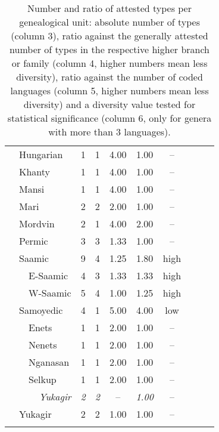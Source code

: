 \begin{footnotesize}
\begin{longtable}[h]{l l l || c || c | c | c || c c c | c}
&\multicolumn{2}{l||}{Hungarian}	&1	&1	&4.00	&1.00	&–\\
&\multicolumn{2}{l||}{Khanty}		&1	&1	&4.00	&1.00&–\\
&\multicolumn{2}{l||}{Mansi}		&1	&1	&4.00	&1.00&–\\
&\multicolumn{2}{l||}{Mari}			&2	&2	&2.00	&1.00&–\\
&\multicolumn{2}{l||}{Mordvin}		&2	&1	&4.00	&2.00&–\\
&\multicolumn{2}{l||}{Permic}		&3	&3	&1.33	&1.00&–\\
&\multicolumn{2}{l||}{Saamic}		&9	&4	&1.25	&1.80			&high\\
&&E-Saamic					&4	&3	&1.33	&1.33			&high\\
&&W-Saamic					&5	&4	&1.00	&1.25			&high\\
&\multicolumn{2}{l||}{Samoyedic}	&4	&1	&5.00	&4.00			&low\\
&&Enets						&1	&1	&2.00	&1.00&–\\
&&Nenets						&1	&1	&2.00	&1.00&–\\
&&Nganasan					&1	&1	&2.00	&1.00&–\\
&&Selkup						&1	&1	&2.00	&1.00&–\\
\hline
\multicolumn{3}{r||}{\textit{Yukagir}}	&\textit{2}&\textit{2}&–&\textit{1.00}&–\\
&\multicolumn{2}{l||}{Yukagir}		&2	&2	&1.00	&1.00&–\\
\hline
\hline
\caption[Number and ratio of attested types per genealogical unit]{Number and ratio of attested types per genealogical unit: absolute number of types (column 3), ratio against the generally attested number of types in the respective higher branch or family (column 4, higher numbers mean less diversity), ratio against the number of coded languages (column 5, higher numbers mean less diversity) and a diversity value tested for statistical significance (column 6, only for genera with more than 3 languages).}\label{diversity}
\end{longtable}
\end{footnotesize}
